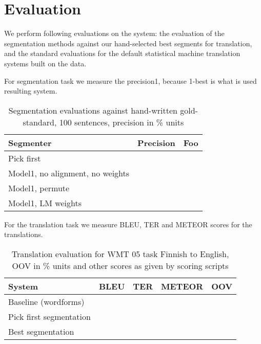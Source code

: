 \documentclass[11pt,letterpaper]{article}
\begin{document}
\section{Evaluation}
\label{sec:evaluation}

We perform following evaluations on the system: the evaluation of the segmentation
methods against our hand-selected best segments for translation, and the
standard evaluations for the default statistical machine translation systems
built on the data. 

For segmentation task we measure the precision\@1, because 1-best is what is
used resulting system.

\begin{table}
    \begin{center}
        \begin{tabular}{|l|rr|}
            \hline
            \bf Segmenter & \bf Precision & \bf Foo \\
            \hline
            Pick first & & \\
            Model1, no alignment, no weights & & \\
            Model1, permute & & \\
            Model1, LM weights & & \\
            \hline
        \end{tabular}
    \end{center}
\caption{\label{table:segment-evaluation} Segmentation evaluations against 
    hand-written gold-standard, 100 sentences, precision in \% units}
\end{table}

For the translation task we measure BLEU, TER and METEOR scores for the
translations.

\begin{table}
    \begin{center}
        \begin{tabular}{|l|rrrr|}
            \hline
            \bf System & \bf BLEU & \bf TER & \bf METEOR & \bf OOV \\
            \hline
            Baseline (wordforms) & & & & \\
            Pick first segmentation & & & & \\
            Best segmentation & & & & \\
            \hline
        \end{tabular}
    \end{center}
    \caption{\label{table:translation-evaluation-fin-eng} Translation
        evaluation for WMT 05 task Finnish to English, OOV in \% units
    and other scores as given by scoring scripts}
\end{table}
\end{document}
